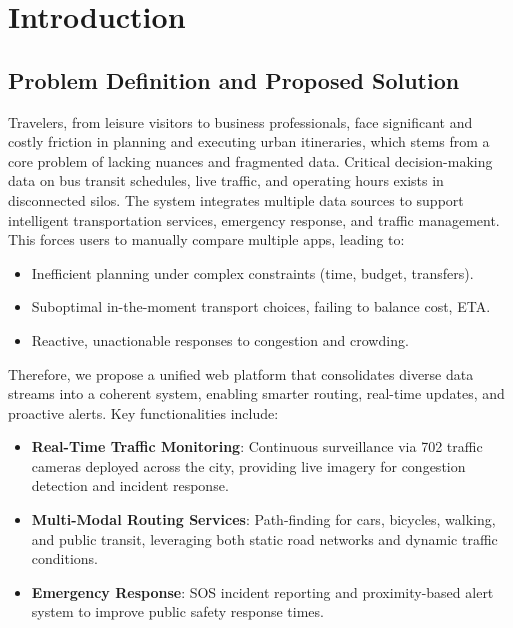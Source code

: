 \chapter{Introduction}

\section{Problem Definition and Proposed Solution}

Travelers, from leisure visitors to business professionals, face significant and costly friction
in planning and executing urban itineraries, which stems from a core problem of lacking
nuances and fragmented data. Critical decision-making data on bus transit schedules, live traffic, and operating hours exists in disconnected silos. The system integrates multiple data sources to support intelligent transportation services, emergency response, and traffic management. 
This forces users to manually compare multiple apps, leading to:
\begin{itemize}
    \item Inefficient planning under complex constraints (time, budget, transfers).
    \item Suboptimal in-the-moment transport choices, failing to balance cost, ETA.
    \item Reactive, unactionable responses to congestion and crowding.
\end{itemize}

Therefore, we propose a unified web platform that consolidates diverse data streams into a coherent system, enabling smarter routing, real-time updates, and proactive alerts.
Key functionalities include:
\begin{itemize}
    \item \textbf{Real-Time Traffic Monitoring}: Continuous surveillance via 702 traffic cameras deployed across the city, providing live imagery for congestion detection and incident response.
    \item \textbf{Multi-Modal Routing Services}: Path-finding for cars, bicycles, walking, and public transit, leveraging both static road networks and dynamic traffic conditions.
    \item \textbf{Emergency Response}: SOS incident reporting and proximity-based alert system to improve public safety response times.
\end{itemize}

